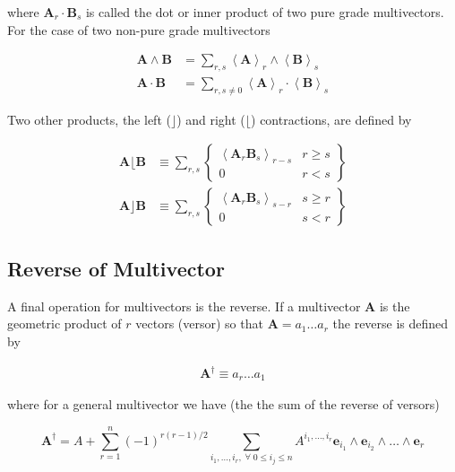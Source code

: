 \documentclass[12pt]{report}
\newcommand{\bm}[1]{\boldsymbol{#1}}
\newcommand{\llt}{\left <}
\newcommand{\rgt}{\right >}
\newcommand{\W}{\wedge}
\newcommand{\R}{\dagger}
\newcommand{\proj}[2]{\llt {#1} \rgt_{#2}}
\newcommand{\braces}[1]{\left \{ {#1} \right \}}
\newcommand{\eb}{\bm{e}}
\begin{document}
where $\bm{A}_{r}\cdot\bm{B}_{s}$ is called the dot or inner product of
two pure grade multivectors.  For the case of two non-pure grade multivectors

   \begin{align}
      \bm{A}\W\bm{B} &= \sum_{r,s}\proj{\bm{A}}{r}\W\proj{\bm{B}}{{s}} \\
      \bm{A}\cdot\bm{B} &= \sum_{r,s\ne 0}\proj{\bm{A}}{r}\cdot\proj{\bm{B}}{{s}}
   \end{align}

Two other products, the left ($\rfloor$) and right ($\lfloor$) contractions, are defined by

   \begin{align}
      \bm{A}\lfloor\bm{B} &\equiv \sum_{r,s}\braces{\begin{array}{cc} \proj{\bm{A}_r\bm{B}_{s}}{r-s} & r \ge s \\
                                                  0                                               & r < s \end{array}}  \\
      \bm{A}\rfloor\bm{B} &\equiv \sum_{r,s}\braces{\begin{array}{cc} \proj{\bm{A}_{r}\bm{B}_{s}}{s-r} & s \ge r \\
                                                  0                                               & s < r\end{array}}
   \end{align}

\subsection{Reverse of Multivector}

A final operation for multivectors is the reverse.  If a multivector $\bm{A}$ is the geometric product of $r$ vectors (versor)
so that $\bm{A} = a_{1}\dots a_{r}$ the reverse is defined by

   \begin{align}
      \bm{A}^{\R} \equiv a_{r}\dots a_{1}
   \end{align}

where for a general multivector we have (the the sum of the reverse of versors)

   \begin{equation}
      \bm{A}^{\R} = A + \sum_{r=1}^{n}(-1)^{r(r-1)/2}\sum_{i_{1},\dots,i_{r},\;\forall\; 0\le i_{j} \le n} A^{i_{1},\dots,i_{r}}\eb_{i_{1}}\W \eb_{i_{2}}\W\dots\W \eb_{r}
   \end{equation}
\end{document}
